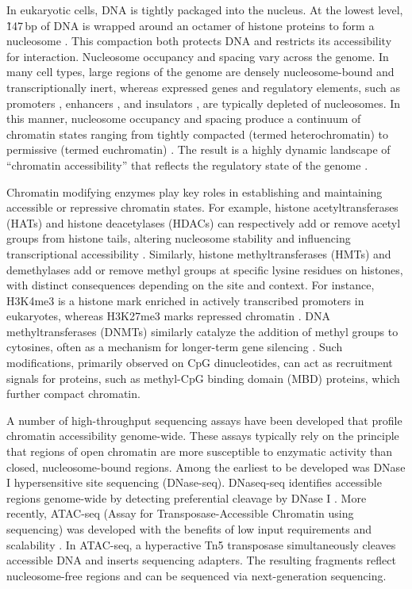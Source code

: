 \begin{dissertationintroduction}
In eukaryotic cells, DNA is tightly packaged into the nucleus. At the lowest level, \~147\,bp of DNA is wrapped around an octamer of histone proteins to form a nucleosome \cite{Klemm2019-iv}. This compaction both protects DNA and restricts its accessibility for interaction. Nucleosome occupancy and spacing vary across the genome. In many cell types, large regions of the genome are densely nucleosome-bound and transcriptionally inert, whereas expressed genes and regulatory elements, such as promoters \cite{Hartley2009-ab}, enhancers \cite{Levine2010-ry}, and insulators \cite{West2002-tz}, are typically depleted of nucleosomes. In this manner, nucleosome occupancy and spacing produce a continuum of chromatin states ranging from tightly compacted (termed heterochromatin) to permissive (termed euchromatin) \cite{Klemm2019-iv}. The result is a highly dynamic landscape of “chromatin accessibility” that reflects the regulatory state of the genome \cite{Meuleman2020-cc}.

Chromatin modifying enzymes play key roles in establishing and maintaining accessible or repressive chromatin states. For example, histone acetyltransferases (HATs) and histone deacetylases (HDACs) can respectively add or remove acetyl groups from histone tails, altering nucleosome stability and influencing transcriptional accessibility \cite{Eberharter2002-hm}. Similarly, histone methyltransferases (HMTs) and demethylases add or remove methyl groups at specific lysine residues on histones, with distinct consequences depending on the site and context. For instance, H3K4me3 is a histone mark enriched in actively transcribed promoters in eukaryotes, whereas H3K27me3 marks repressed chromatin \cite{Millan-Zambrano2022-pr}. DNA methyltransferases (DNMTs) similarly catalyze the addition of methyl groups to cytosines, often as a mechanism for longer-term gene silencing \cite{Moore2013-gr}. Such modifications, primarily observed on CpG dinucleotides, can act as recruitment signals for proteins, such as methyl-CpG binding domain (MBD) proteins, which further compact chromatin.

A number of high-throughput sequencing assays have been developed that profile chromatin accessibility genome-wide. These assays typically rely on the principle that regions of open chromatin are more susceptible to enzymatic activity than closed, nucleosome-bound regions. Among the earliest to be developed was DNase I hypersensitive site sequencing (DNase-seq). DNaseq-seq identifies accessible regions genome-wide by detecting preferential cleavage by DNase I \cite{Song2010-nn}. More recently, ATAC-seq (Assay for Transposase-Accessible Chromatin using sequencing) was developed with the benefits of low input requirements and scalability \cite{Buenrostro2013-lj}. In ATAC-seq, a hyperactive Tn5 transposase simultaneously cleaves accessible DNA and inserts sequencing adapters. The resulting fragments reflect nucleosome-free regions and can be sequenced via next-generation sequencing.


\end{dissertationintroduction}
